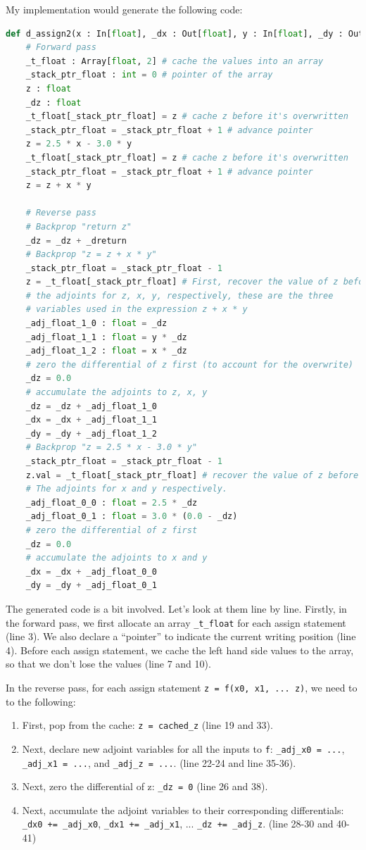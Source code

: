 My implementation would generate the following code:
\begin{lstlisting}[language=Python]
def d_assign2(x : In[float], _dx : Out[float], y : In[float], _dy : Out[float], _dreturn : In[float]):
	# Forward pass
	_t_float : Array[float, 2] # cache the values into an array
	_stack_ptr_float : int = 0 # pointer of the array
	z : float
	_dz : float
	_t_float[_stack_ptr_float] = z # cache z before it's overwritten
	_stack_ptr_float = _stack_ptr_float + 1 # advance pointer
	z = 2.5 * x - 3.0 * y
	_t_float[_stack_ptr_float] = z # cache z before it's overwritten
	_stack_ptr_float = _stack_ptr_float + 1 # advance pointer
	z = z + x * y
	
	# Reverse pass
	# Backprop "return z"
	_dz = _dz + _dreturn
	# Backprop "z = z + x * y"
	_stack_ptr_float = _stack_ptr_float - 1
	z = _t_float[_stack_ptr_float] # First, recover the value of z before overwrite
	# the adjoints for z, x, y, respectively, these are the three
	# variables used in the expression z + x * y
	_adj_float_1_0 : float = _dz
	_adj_float_1_1 : float = y * _dz
	_adj_float_1_2 : float = x * _dz
	# zero the differential of z first (to account for the overwrite)
	_dz = 0.0
	# accumulate the adjoints to z, x, y
	_dz = _dz + _adj_float_1_0
	_dx = _dx + _adj_float_1_1
	_dy = _dy + _adj_float_1_2
	# Backprop "z = 2.5 * x - 3.0 * y"
	_stack_ptr_float = _stack_ptr_float - 1
	z.val = _t_float[_stack_ptr_float] # recover the value of z before overwrite
	# The adjoints for x and y respectively.
	_adj_float_0_0 : float = 2.5 * _dz
	_adj_float_0_1 : float = 3.0 * (0.0 - _dz)
	# zero the differential of z first
	_dz = 0.0
	# accumulate the adjoints to x and y
	_dx = _dx + _adj_float_0_0
	_dy = _dy + _adj_float_0_1
\end{lstlisting}

The generated code is a bit involved. Let's look at them line by line. Firstly, in the forward pass, we
first allocate an array \lstinline{_t_float} for each assign statement (line 3). We also declare a ``pointer'' to indicate the current writing position (line 4). Before each assign statement, we cache the left hand side values to the array, so that we don't lose the values (line 7 and 10).

In the reverse pass, for each assign statement \lstinline{z = f(x0, x1, ... z)}, we need to to the following:
\begin{enumerate}
	\item First, pop from the cache: \lstinline{z = cached_z} (line 19 and 33).
	\item Next, declare new adjoint variables for all the inputs to \lstinline{f}: \lstinline{_adj_x0 = ...}, \lstinline{_adj_x1 = ...}, and \lstinline{_adj_z = ...}. (line 22-24 and line 35-36).
	\item Next, zero the differential of z: \lstinline{_dz = 0} (line 26 and 38).
	\item Next, accumulate the adjoint variables to their corresponding differentials: \lstinline{_dx0 += _adj_x0}, \lstinline{_dx1 += _adj_x1}, ... \lstinline{_dz += _adj_z}. (line 28-30 and 40-41)
\end{enumerate}

